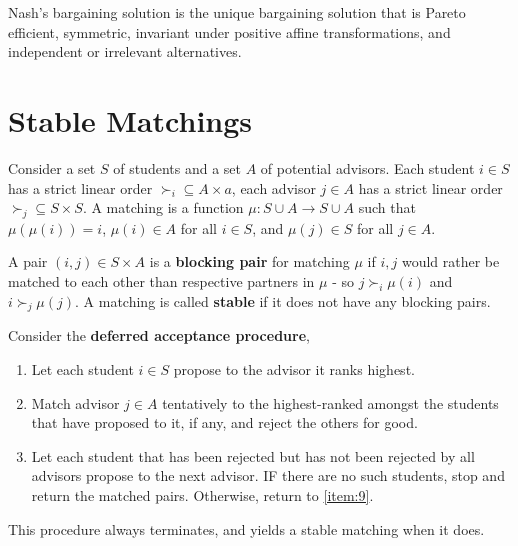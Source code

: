 \begin{thm}
  \label{sec:bargaining-4}
  Nash's bargaining solution is the unique bargaining solution that is
  Pareto efficient, symmetric, invariant under positive affine
  transformations, and independent or irrelevant alternatives.
\end{thm}

\section{Stable Matchings}
\label{sec:stable-matchings}

\begin{defn}
  \label{sec:stable-matchings-1}
  Consider a set $S$ of students and a set $A$ of potential advisors.
  Each student $i \in S$ has a strict linear order $\succ_{i}
  \subseteq A \times a$, each advisor $j \in A$ has a strict linear
  order $\succ_{j} \subseteq S \times S$.  A matching is a function
  $\mu: S \cup A \rightarrow S \cup A$ such that $\mu(\mu(i)) = i$,
  $\mu(i) \in A$ for all $i \in S$, and $\mu(j) \in S$ for all $j \in
  A$.  

  A pair $(i, j) \in S \times A$  is a \textbf{blocking pair} for
  matching $\mu$ if $i, j$ would rather be matched to each other than
  respective partners in $\mu$ - so $j \succ_{i} \mu(i)$ and $i
  \succ_{j} \mu(j)$.  A matching is called \textbf{stable} if it
  does not have any blocking pairs.
\end{defn}

\begin{thm}
  \label{sec:stable-matchings-2}
  Consider the \textbf{deferred acceptance procedure},
  \begin{enumerate}
  \item Let each student $i \in S$ propose to the advisor it ranks highest.
  \item\label{item:9} Match advisor $j \in A$ tentatively to the highest-ranked
    amongst the students that have proposed to it, if any, and reject
    the others for good.
  \item Let each student that has been rejected but has not been
    rejected by all advisors propose to the next advisor. IF there are
    no such students, stop and return the matched pairs.  Otherwise,
    return to \ref{item:9}.
  \end{enumerate}

  This procedure always terminates, and yields a stable matching when
  it does.
\end{thm}

